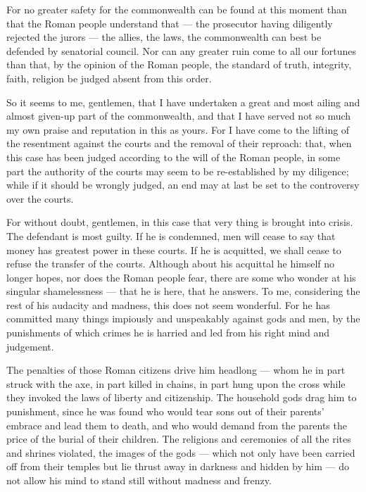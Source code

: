  For no greater safety for the commonwealth can be found at this moment than that the Roman people understand that --- the prosecutor having diligently rejected the jurors --- the allies, the laws, the commonwealth can best be defended by senatorial council. Nor can any greater ruin come to all our fortunes than that, by the opinion of the Roman people, the standard of truth, integrity, faith, religion be judged absent from this order.

 So it seems to me, gentlemen, that I have undertaken a great and most ailing and almost given-up part of the commonwealth, and that I have served not so much my own praise and reputation in this as yours. For I have come to the lifting of the resentment against the courts and the removal of their reproach: that, when this case has been judged according to the will of the Roman people, in some part the authority of the courts may seem to be re-established by my diligence; while if it should be wrongly judged, an end may at last be set to the controversy over the courts.

 For without doubt, gentlemen, in this case that very thing is brought into crisis. The defendant is most guilty. If he is condemned, men will cease to say that money has greatest power in these courts. If he is acquitted, we shall cease to refuse the transfer of the courts. Although about his acquittal he himself no longer hopes, nor does the Roman people fear, there are some who wonder at his singular shamelessness --- that he is here, that he answers. To me, considering the rest of his audacity and madness, this does not seem wonderful. For he has committed many things impiously and unspeakably against gods and men, by the punishments of which crimes he is harried and led from his right mind and judgement.

 The penalties of those Roman citizens drive him headlong --- whom he in part struck with the axe, in part killed in chains, in part hung upon the cross while they invoked the laws of liberty and citizenship. The household gods drag him to punishment, since he was found who would tear sons out of their parents' embrace and lead them to death, and who would demand from the parents the price of the burial of their children. The religions and ceremonies of all the rites and shrines violated, the images of the gods --- which not only have been carried off from their temples but lie thrust away in darkness and hidden by him --- do not allow his mind to stand still without madness and frenzy.

